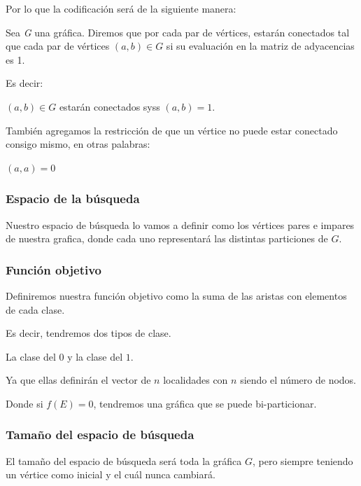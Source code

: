 \documentclass{article}
\begin{document}
Por lo que la codificación será de la siguiente manera:

Sea \textit{G} una gráfica. Diremos que por cada par de vértices, estarán
conectados tal que cada par de vértices $(a,b) \in G$ si su 
evaluación en la matriz de adyacencias es 1.

Es decir:

$(a,b) \in G$ estarán conectados syss $(a,b)=1$.

También agregamos la restricción de que un vértice no puede estar
conectado consigo mismo, en otras palabras:

$(a,a)=0$

\subsubsection*{Espacio de la búsqueda}

Nuestro espacio de búsqueda lo vamos a definir como los vértices 
pares e impares de nuestra grafica, donde cada uno representará
las distintas particiones de $G$.

\subsubsection*{Función objetivo}
Definiremos nuestra función objetivo como la suma de las aristas con
elementos de cada clase.

Es decir, tendremos dos tipos de clase.

La clase del $0$ y la clase del $1$.

Ya que ellas definirán el vector de $n$ localidades con $n$ 
siendo el número de nodos.

Donde si $f(E) = 0$, tendremos una gráfica que se puede 
bi-particionar.

\subsubsection*{Tamaño del espacio de búsqueda}
El tamaño del espacio de búsqueda será toda la gráfica $G$, pero
siempre teniendo un vértice como inicial y el cuál nunca cambiará.
\end{document}
